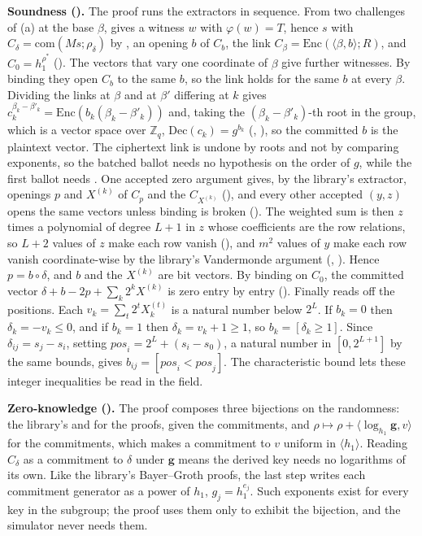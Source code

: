 \textbf{Soundness ().} The proof runs the extractors in sequence. From two challenges of (a) at
the base $\beta$,  gives a witness $w$ with $\varphi(w) =
T$, hence $s$ with $C_\delta = \mathrm{com}(Ms; \rho_\delta)$ by
, an opening $b$ of $C_b$, the link $C_\beta =
\mathrm{Enc}(\langle \beta, b\rangle; R)$, and $C_0 = h_1^{\rho^*}$
(). The vectors that vary one coordinate of
$\beta$ give further witnesses. By binding they open $C_b$ to the same
$b$, so the link holds for the same $b$ at every $\beta$. Dividing the
links at $\beta$ and at $\beta'$ differing at $k$ gives $c_k^{\beta_k -
\beta'_k} = \mathrm{Enc}(b_k (\beta_k - \beta'_k))$ and, taking the
$(\beta_k - \beta'_k)$-th root in the group, which is a vector space over
$\mathbb{Z}_q$, $\mathrm{Dec}(c_k) = g^{b_k}$ (,
), so the committed $b$ is the plaintext vector. The
ciphertext link is undone by roots and not by comparing exponents,
so the batched ballot needs no hypothesis on the order of $g$, while
the first ballot needs . One accepted zero argument
gives, by the library's extractor, openings $p$ and $X^{(k)}$ of $C_p$
and the $C_{X^{(k)}}$ (), and every other accepted
$(y, z)$ opens the same vectors unless binding is broken
(). The weighted sum is then $z$ times a polynomial
of degree $L + 1$ in $z$ whose coefficients are the row relations, so $L
+ 2$ values of $z$ make each row vanish (), and
$m^2$ values of $y$ make each row vanish coordinate-wise by the
library's Vandermonde argument (,
). Hence $p = b \circ \delta$, and $b$ and the
$X^{(k)}$ are bit vectors. By binding on $C_0$, the committed vector
$\delta + b - 2p + \sum_k 2^k X^{(k)}$ is zero entry by entry
(). Finally  reads off the
positions. Each $v_k = \sum_t 2^t X^{(t)}_k$ is a natural number below
$2^L$. If $b_k = 0$ then $\delta_k = -v_k \le 0$, and if $b_k = 1$ then
$\delta_k = v_k + 1 \ge 1$, so $b_k = [\delta_k \ge 1]$. Since
$\delta_{ij} = s_j - s_i$, setting $\mathit{pos}_i = 2^L + (s_i - s_0)$,
a natural number in $[0, 2^{L+1}]$ by the same bounds, gives $b_{ij} =
[\mathit{pos}_i < \mathit{pos}_j]$. The characteristic bound lets these
integer inequalities be read in the field.

\textbf{Zero-knowledge ().} The proof composes three bijections on the randomness: the library's
 and  for the proofs, given the
commitments, and $\rho \mapsto \rho + \langle \log_{h_1} \mathbf{g},
v\rangle$ for the commitments, which makes a commitment to $v$ uniform
in $\langle h_1 \rangle$. Reading $C_\delta$ as a commitment to $\delta$
under $\mathbf{g}$ means the derived key needs no logarithms of its own.
Like the library's Bayer--Groth proofs, the last step writes each
commitment generator as a power of $h_1$, $g_j = h_1^{e_j}$. Such
exponents exist for every key in the subgroup; the proof uses them only
to exhibit the bijection, and the simulator never needs them.
